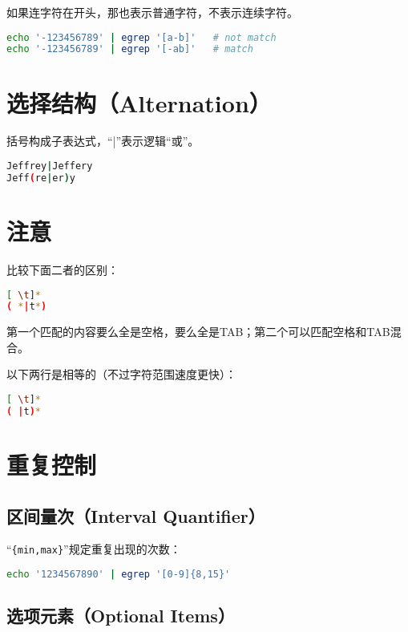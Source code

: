 如果连字符在开头，那也表示普通字符，不表示连续字符。
\begin{lstlisting}[language=bash]
echo '-123456789' | egrep '[a-b]'   # not match
echo '-123456789' | egrep '[-ab]'   # match
\end{lstlisting}



\section{选择结构（Alternation）}

括号构成子表达式，“\verb|||”表示逻辑“或”。
\begin{lstlisting}[language=bash]
Jeffrey|Jeffery
Jeff(re|er)y
\end{lstlisting}



\section{注意}

比较下面二者的区别：

\begin{lstlisting}[language=bash]
[ \t]*
( *|t*)
\end{lstlisting}

第一个匹配的内容要么全是空格，要么全是TAB；第二个可以匹配空格和TAB混合。

以下两行是相等的（不过字符范围速度更快）：

\begin{lstlisting}[language=bash]
[ \t]*
( |t)*
\end{lstlisting}



\section{重复控制}

\subsection{区间量次（Interval Quantifier）}

“\verb|{min,max}|”规定重复出现的次数：
\begin{lstlisting}[language=bash]
echo '1234567890' | egrep '[0-9]{8,15}' 
\end{lstlisting}

\subsection{选项元素（Optional Items）}

